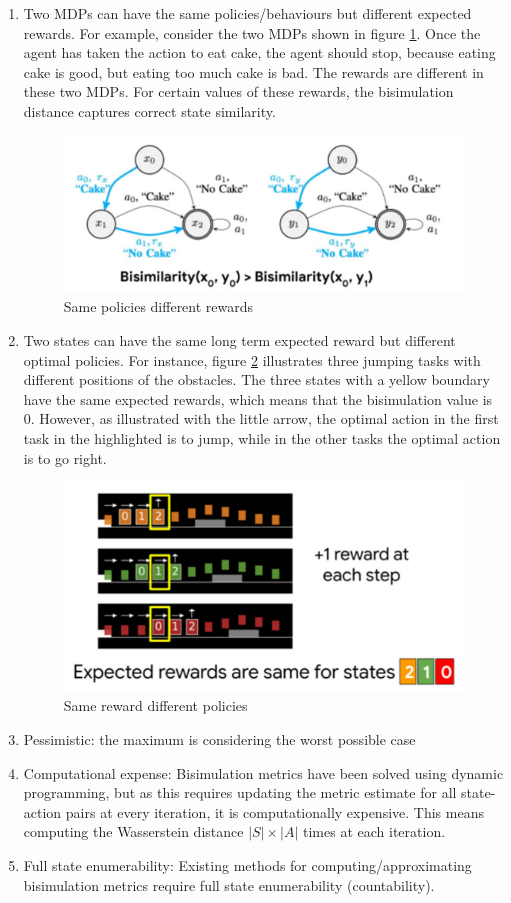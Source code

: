 \documentclass{usiinftr}
\begin{document}
\begin{enumerate}
    \item Two MDPs can have the same policies/behaviours but different expected rewards. For example, consider the two MDPs shown in figure \ref{fig:TwoMDP}. Once the agent has taken the action to eat cake, the agent should stop, because eating cake is good, but eating too much cake is bad. The rewards are different in these two MDPs. For certain values of these rewards, the bisimulation distance captures correct state similarity.
\begin{figure}[h]
    \centering
    \includegraphics[width = 0.5\linewidth]{figures/image7.png}
    \caption{Same policies different rewards}
    \label{fig:TwoMDP}
\end{figure}
    \item Two states can have the same long term expected reward but different optimal policies. For instance,  figure \ref{fig:ThreeJump} illustrates three jumping tasks with different positions of the obstacles. The three states with a yellow boundary have the same expected rewards, which means that the bisimulation value is 0. However, as illustrated with the little arrow, the optimal action in the first task in the highlighted is to jump, while in the other tasks the optimal action is to go right.
\begin{figure}[h]
    \centering
    \includegraphics[width = 0.5\linewidth]{figures/image8.png}
    \caption{Same reward different policies}
    \label{fig:ThreeJump}
\end{figure}
    \item Pessimistic: the maximum is considering the worst possible case
    \item Computational expense: Bisimulation metrics have been solved using dynamic programming, but as this requires updating the metric estimate for all state-action pairs at every iteration, it is computationally expensive. This means computing the Wasserstein distance $|S|\times|A|$ times at each iteration.
    \item Full state enumerability: Existing methods for computing/approximating bisimulation metrics require full state enumerability (countability).
\end{enumerate}
\end{document}
